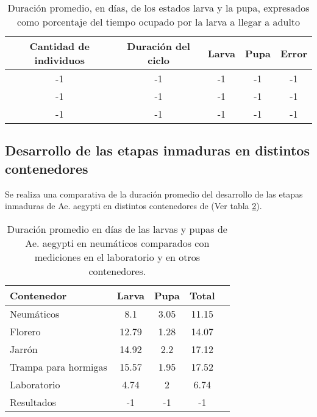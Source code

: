 \begin{table}
\begin{center}
\begin{tabular}{c c c c c }
Cantidad de individuos & Duración del ciclo & Larva & Pupa  & Error\\
\hline
-1   & -1 & -1 & -1 & -1   \\
-1   & -1 & -1 & -1 & -1   \\
-1   & -1 & -1 & -1 & -1   \\
\end{tabular}
\caption{ \label{tab:desarrollo-ciclo-distribucion-test} Duración promedio, en días, de los estados larva
y la pupa, expresados como porcentaje del tiempo ocupado por la larva a llegar a adulto}
\end{center}
\end{table}

\subsection{Desarrollo de las etapas inmaduras en distintos contenedores}
Se realiza una comparativa de la duración promedio del desarrollo de las etapas inmaduras de Ae. aegypti 
en distintos contenedores de \cite{manrique1998desarrollo} (Ver tabla
\ref{tab:desarrollo-ciclo-contenedores-test}).

\begin{table}
\begin{center}
\begin{tabular}{p{5cm} c c c c }
Contenedor           & Larva & Pupa & Total \\
\hline
Neumáticos           & 8.1   & 3.05 & 11.15\\
Florero              & 12.79 & 1.28 & 14.07\\
Jarrón               & 14.92 & 2.2  & 17.12\\
Trampa para hormigas & 15.57 & 1.95 & 17.52\\
Laboratorio          & 4.74  & 2    & 6.74\\
Resultados           & -1    & -1   & -1\\
\end{tabular}

\caption{ \label{tab:desarrollo-ciclo-contenedores-test} Duración promedio en días de las  larvas y pupas
de Ae. aegypti en neumáticos comparados con mediciones en el laboratorio y en otros contenedores.}
\end{center}
\end{table}
